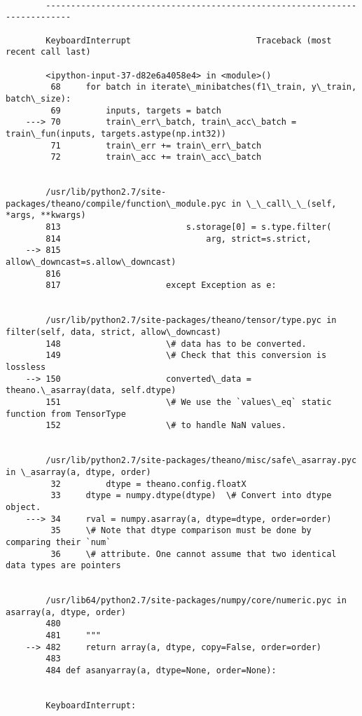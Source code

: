 \documentclass{article}
\begin{document}
    \begin{Verbatim}[commandchars=\\\{\}]

        ---------------------------------------------------------------------------

        KeyboardInterrupt                         Traceback (most recent call last)

        <ipython-input-37-d82e6a4058e4> in <module>()
         68     for batch in iterate\_minibatches(f1\_train, y\_train, batch\_size):
         69         inputs, targets = batch
    ---> 70         train\_err\_batch, train\_acc\_batch = train\_fun(inputs, targets.astype(np.int32))
         71         train\_err += train\_err\_batch
         72         train\_acc += train\_acc\_batch
    

        /usr/lib/python2.7/site-packages/theano/compile/function\_module.pyc in \_\_call\_\_(self, *args, **kwargs)
        813                         s.storage[0] = s.type.filter(
        814                             arg, strict=s.strict,
    --> 815                             allow\_downcast=s.allow\_downcast)
        816 
        817                     except Exception as e:
    

        /usr/lib/python2.7/site-packages/theano/tensor/type.pyc in filter(self, data, strict, allow\_downcast)
        148                     \# data has to be converted.
        149                     \# Check that this conversion is lossless
    --> 150                     converted\_data = theano.\_asarray(data, self.dtype)
        151                     \# We use the `values\_eq` static function from TensorType
        152                     \# to handle NaN values.
    

        /usr/lib/python2.7/site-packages/theano/misc/safe\_asarray.pyc in \_asarray(a, dtype, order)
         32         dtype = theano.config.floatX
         33     dtype = numpy.dtype(dtype)  \# Convert into dtype object.
    ---> 34     rval = numpy.asarray(a, dtype=dtype, order=order)
         35     \# Note that dtype comparison must be done by comparing their `num`
         36     \# attribute. One cannot assume that two identical data types are pointers
    

        /usr/lib64/python2.7/site-packages/numpy/core/numeric.pyc in asarray(a, dtype, order)
        480 
        481     """
    --> 482     return array(a, dtype, copy=False, order=order)
        483 
        484 def asanyarray(a, dtype=None, order=None):
    

        KeyboardInterrupt: 

    \end{Verbatim}
\end{document}
